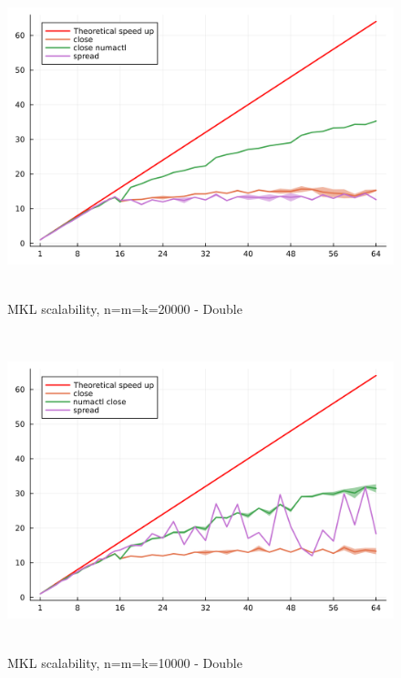 \documentclass[
  letterpaper,
  DIV=11,
  numbers=noendperiod]{scrartcl}
\begin{document}
\begin{figure}

{\centering \includegraphics[width=\textwidth,height=3.64583in]{img/mkl_scalability_double_20000.png}

}

\caption{MKL scalability, n=m=k=20000 - Double}

\end{figure}

\begin{figure}

{\centering \includegraphics[width=\textwidth,height=3.64583in]{img/mkl_scalability_double_10000.png}

}

\caption{MKL scalability, n=m=k=10000 - Double}

\end{figure}
\end{document}
